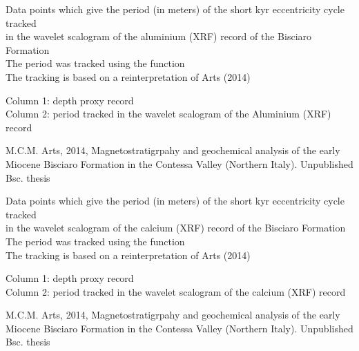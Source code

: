 \documentclass[a4paper]{book}
\begin{document}
%
\begin{Description}
Data points which give the period (in meters) of the short kyr eccentricity cycle tracked \\{}
in the wavelet scalogram of the aluminium (XRF) record of the Bisciaro Formation \\{}
The period was tracked using the  function\\{}
The tracking is based on a reinterpretation of Arts (2014)\\{}
\end{Description}
%
\begin{Details}
Column 1: depth proxy record\\{}
Column 2: period tracked in the wavelet scalogram of the Aluminium (XRF) record
\end{Details}
%
\begin{References}
M.C.M. Arts, 2014,
Magnetostratigrpahy and geochemical analysis of the early Miocene Bisciaro Formation
in the Contessa Valley (Northern Italy). Unpublished Bsc. thesis \\{}
\end{References}
%
\begin{Description}
Data points which give the period (in meters) of the short kyr eccentricity cycle tracked \\{}
in the wavelet scalogram of the calcium (XRF) record of the Bisciaro Formation \\{}
The period was tracked using the  function\\{}
The tracking is based on a reinterpretation of Arts (2014)\\{}
\end{Description}
%
\begin{Details}
Column 1: depth proxy record\\{}
Column 2: period tracked in the wavelet scalogram of the calcium (XRF) record
\end{Details}
%
\begin{References}
M.C.M. Arts, 2014,
Magnetostratigrpahy and geochemical analysis of the early Miocene Bisciaro Formation
in the Contessa Valley (Northern Italy). Unpublished Bsc. thesis \\{}
\end{References}
\end{document}
